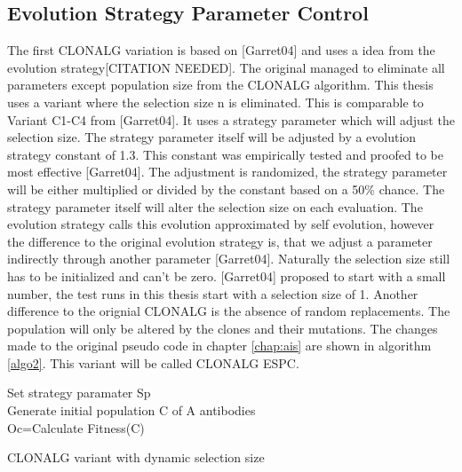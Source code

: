 \subsection{Evolution Strategy Parameter Control}
The first CLONALG variation is based on [Garret04] and uses a idea from the evolution strategy[CITATION NEEDED]. The original managed to eliminate all parameters except population size from the CLONALG algorithm. This thesis uses a variant where the selection size n is eliminated. This is comparable to Variant C1-C4 from [Garret04]. It uses a strategy parameter which will adjust the selection size. The strategy parameter itself will be adjusted by a evolution strategy constant of 1.3. This constant was empirically tested and proofed to be most effective [Garret04]. The adjustment is randomized, the strategy parameter will be either multiplied or divided by the constant based on a 50\% chance. The strategy parameter itself will alter the selection size on each evaluation. The evolution strategy calls this evolution approximated by self evolution, however the difference to the original evolution strategy is, that we adjust a parameter indirectly through another parameter [Garret04]. Naturally the selection size still has to be initialized and can't be zero. [Garret04] proposed to start with a small number, the test runs in this thesis start with a selection size of 1. Another difference to the orignial CLONALG is the absence of random replacements. The population will only be altered by the clones and their mutations. The changes made to the original pseudo code in chapter \ref{chap:ais} are shown in algorithm \ref{algo2}. This variant will be called CLONALG ESPC.
\begin{algorithm}[H]
	Set strategy paramater Sp\\
	Generate initial population C of A antibodies\\
	Oc=Calculate Fitness(C)\\
	\caption{CLONALG variant with dynamic selection size}
	\label{algo2}
\end{algorithm}
